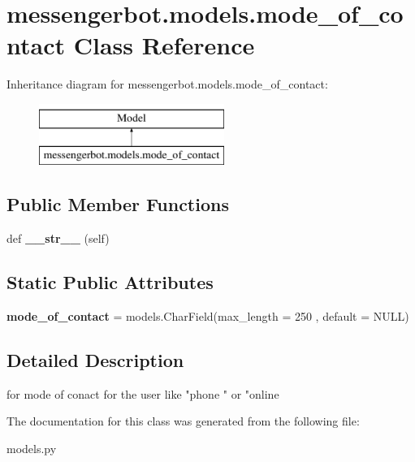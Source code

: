 \hypertarget{classmessengerbot_1_1models_1_1mode__of__contact}{}\section{messengerbot.\+models.\+mode\+\_\+of\+\_\+contact Class Reference}
\label{classmessengerbot_1_1models_1_1mode__of__contact}
Inheritance diagram for messengerbot.\+models.\+mode\+\_\+of\+\_\+contact\+:\begin{figure}[H]
\begin{center}
\leavevmode
\includegraphics[height=2.000000cm]{classmessengerbot_1_1models_1_1mode__of__contact}
\end{center}
\end{figure}
\subsection*{Public Member Functions}
\begin{DoxyCompactItemize}
\item 
\mbox{\label{classmessengerbot_1_1models_1_1mode__of__contact_a6ebd4c5bca4b5fbaa27f327d67b57b18}} 
def {\bfseries \+\_\+\+\_\+str\+\_\+\+\_\+} (self)
\end{DoxyCompactItemize}
\subsection*{Static Public Attributes}
\begin{DoxyCompactItemize}
\item 
\mbox{\label{classmessengerbot_1_1models_1_1mode__of__contact_aad7efb4a0b7b09beb5faae33659984a7}} 
{\bfseries mode\+\_\+of\+\_\+contact} = models.\+Char\+Field(max\+\_\+length = 250 , default = \textquotesingle{}N\+U\+LL\textquotesingle{})
\end{DoxyCompactItemize}


\subsection{Detailed Description}
\begin{DoxyVerb}for mode of conact for the user like "phone " or "online\end{DoxyVerb}
 

The documentation for this class was generated from the following file\+:\begin{DoxyCompactItemize}
\item 
models.\+py\end{DoxyCompactItemize}
